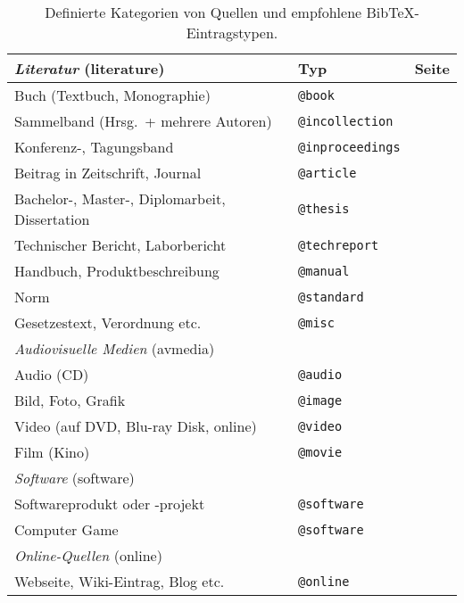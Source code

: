 \begin{table}
\caption{Definierte Kategorien von Quellen und empfohlene BibTeX-Eintragstypen.}
\label{tab:QuellenUndEintragstypen}
\centering
\begin{tabular}{llc}
	\hline
	\emph{Literatur} (\textsf{literature}) & Typ & Seite\\
	\hline
	Buch (Textbuch, Monographie) & \texttt{@book} & \pageref{sec:@book}\\
	Sammelband (Hrsg.\ + mehrere Autoren) & \texttt{@incollection} & \pageref{sec:@incollection} \\
	Konferenz-, Tagungsband & \texttt{@inproceedings} & \pageref{sec:@inproceedings}\\
	Beitrag in Zeitschrift, Journal & \texttt{@article} & \pageref{sec:@article}\\
	Bachelor-, Master-, Diplomarbeit, Dissertation & \texttt{@thesis} & \pageref{sec:@thesis}\\
	Technischer Bericht, Laborbericht & \texttt{@techreport} & \pageref{sec:@techreport}\\
	Handbuch, Produktbeschreibung & \texttt{@manual} & \pageref{sec:@manual}\\
	Norm & \texttt{@standard} & \pageref{sec:@standard}\\
	Gesetzestext, Verordnung etc. & \texttt{@misc} & \pageref{sec:@misc}\\
%
	\hline
	\emph{Audiovisuelle Medien} (\textsf{avmedia}) & \\
	\hline
	Audio (CD) & \texttt{@audio} & \pageref{sec:@audio}\\
	Bild, Foto, Grafik & \texttt{@image} & \pageref{sec:@image}\\
	Video (auf DVD, Blu-ray Disk, online) & \texttt{@video} & \pageref{sec:@video}\\
	Film (Kino) & \texttt{@movie} & \pageref{sec:@movie}\\
%
	\hline
	\emph{Software} (\textsf{software}) & \\
	\hline
	Softwareprodukt oder -projekt & \texttt{@software} & \pageref{sec:@software}\\
	Computer Game & \texttt{@software} & \pageref{sec:@software}\\
%
	\hline
	\emph{Online-Quellen} (\textsf{online}) & \\
	\hline
	Webseite, Wiki-Eintrag, Blog etc. & \texttt{@online} & \pageref{sec:@online-www}
\end{tabular}
\end{table}


